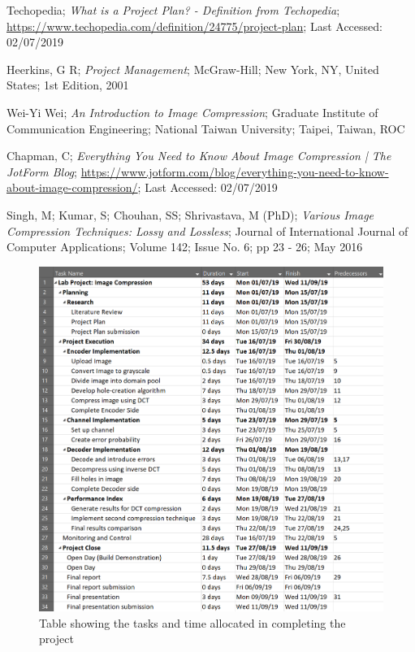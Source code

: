 \documentclass[10pt,twocolumn, a4paper]{witseiepaper}
\begin{document}
%
\begin{thebibliography}{}


Techopedia; \emph{What is a Project Plan? - Definition from Techopedia}; \url{https://www.techopedia.com/definition/24775/project-plan}; Last Accessed: 02/07/2019

Heerkins, G R; \emph{Project Management}; McGraw-Hill; New York, NY, United States; 1st Edition, 2001

Wei-Yi Wei; \emph{An Introduction to Image Compression}; Graduate Institute of Communication Engineering; National Taiwan University; Taipei, Taiwan, ROC

Chapman, C; \emph{Everything You Need to Know About Image Compression | The JotForm Blog}; \url{https://www.jotform.com/blog/everything-you-need-to-know-about-image-compression/}; Last Accessed: 02/07/2019

Singh, M; Kumar, S; Chouhan, SS; Shrivastava, M (PhD); \emph{Various Image Compression Techniques: Lossy and Lossless}; Journal of International Journal of Computer Applications; Volume 142; Issue No. 6; pp 23 - 26; May 2016

\end{thebibliography}

\onecolumn
\begin{figure}[h!]
\renewcommand{\thefigure}{\arabic{figure}}
\centering
\includegraphics[scale=0.8, frame]{TableTasks.png}
\caption{Table showing the tasks and time allocated in completing the project}
\label{fig: Tasks}
\end{figure}
\end{document}
